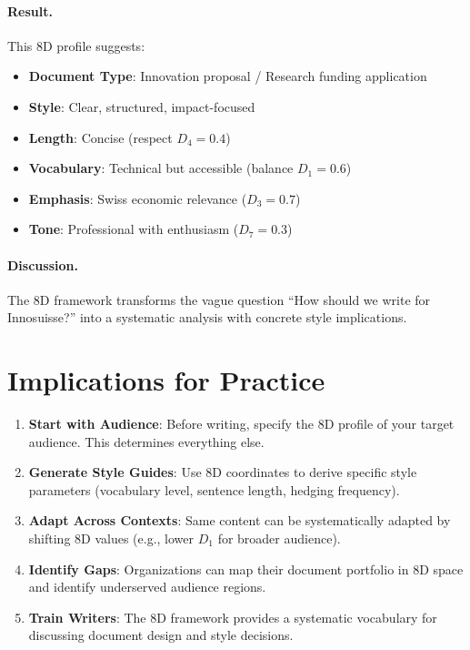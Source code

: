 \paragraph{Result.} This 8D profile suggests:

\begin{itemize}[nosep]
\item \textbf{Document Type}: Innovation proposal / Research funding application
\item \textbf{Style}: Clear, structured, impact-focused
\item \textbf{Length}: Concise (respect $D_4 = 0.4$)
\item \textbf{Vocabulary}: Technical but accessible (balance $D_1 = 0.6$)
\item \textbf{Emphasis}: Swiss economic relevance ($D_3 = 0.7$)
\item \textbf{Tone}: Professional with enthusiasm ($D_7 = 0.3$)
\end{itemize}

\paragraph{Discussion.} The 8D framework transforms the vague question
``How should we write for Innosuisse?'' into a systematic analysis with
concrete style implications.


\section{Implications for Practice}
\label{sec:doctype-theory-practice}

\begin{tcolorbox}[colback=green!5!white, colframe=green!75!black,
    title=Practical Implications]
\begin{enumerate}
\item \textbf{Start with Audience}: Before writing, specify the 8D profile
      of your target audience. This determines everything else.

\item \textbf{Generate Style Guides}: Use 8D coordinates to derive specific
      style parameters (vocabulary level, sentence length, hedging frequency).

\item \textbf{Adapt Across Contexts}: Same content can be systematically
      adapted by shifting 8D values (e.g., lower $D_1$ for broader audience).

\item \textbf{Identify Gaps}: Organizations can map their document portfolio
      in 8D space and identify underserved audience regions.

\item \textbf{Train Writers}: The 8D framework provides a systematic vocabulary
      for discussing document design and style decisions.
\end{enumerate}
\end{tcolorbox}


